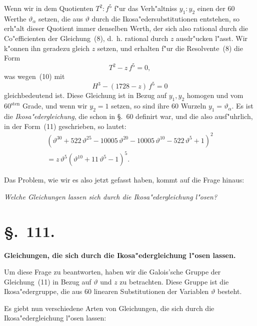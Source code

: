 \documentclass[12pt,a4paper]{article}
\theoremstyle{plain}
\begin{document}
Wenn wir in dem Quotienten $T^2 : f^5$ f"ur das Verh"altniss $y_1 : y_2$ einen der 60 Werthe $\vartheta_\alpha$ setzen, die aus $\vartheta$ durch die Ikosa"edersubstitutionen entstehen, so erh"alt dieser Quotient immer denselben Werth, der sich also rational durch die Co"efficienten der Gleichung~(8), d.~h. rational durch $z$ ausdr"ucken l"asst. Wir k"onnen ihn geradezu gleich $z$ setzen, und erhalten f"ur die Resolvente~(8) die Form
\begin{equation}\tag{11}
T^2 - z\,f^5 = 0,
\end{equation}
was wegen~(10) mit
\[H^3 - (1728 - z)\,f^5 = 0\]
gleichbedeutend ist. Diese Gleichung ist in Bezug auf $y_1, y_2$ homogen und vom $60^{\text{sten}}$ Grade, und wenn wir $y_2=1$ setzen, so sind ihre 60 Wurzeln $y_1 = \vartheta_\alpha$. Es ist die \emph{Ikosa"edergleichung}, die schon in \S.~60 definirt war, und die also ausf"uhrlich, in der Form~(11) geschrieben, so lautet:
\begin{multline*}
(\vartheta^{30} + 522\,\vartheta^{25} - 10005\,\vartheta^{20} - 10005\,\vartheta^{10} - 522\,\vartheta^5 + 1)^2\\
= z\,\vartheta^5(\vartheta^{10} + 11\,\vartheta^5 - 1)^5.
\end{multline*}

Das Problem, wie wir es also jetzt gefasst haben, kommt auf die Frage hinaus:

\begin{center}
\emph{Welche Gleichungen lassen sich durch die Ikosa"edergleichung l"osen?}
\end{center}

\section*{\S.~111.}
\begin{center}
\large\bfseries Gleichungen, die sich durch die Ikosa"edergleichung l"osen lassen.
\end{center}
\vspace{0.5em}

Um diese Frage zu beantworten, haben wir die Galois'sche Gruppe der Gleichung~(11) in Bezug auf $\vartheta$ und $z$ zu betrachten. Diese Gruppe ist die Ikosa"edergruppe, die aus 60 linearen Substitutionen der Variablen $\vartheta$ besteht.

Es giebt nun verschiedene Arten von Gleichungen, die sich durch die Ikosa"edergleichung l"osen lassen:
\end{document}
